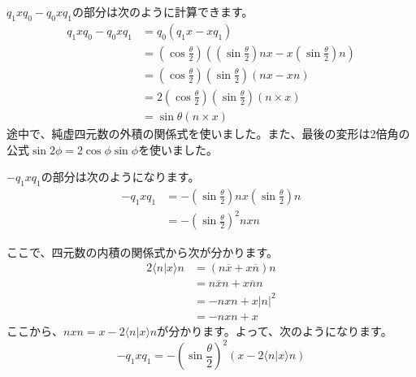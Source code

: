 \documentclass{jlreq}
\numberwithin{equation}{section}
\begin{document}
$q_1xq_0-q_0xq_1$の部分は次のように計算できます。
\begin{align}
    q_1xq_0-q_0xq_1 & =q_0(q_1x-xq_1)                                                                                                        \\
                    & =\left(\cos\frac{\theta}{2}\right)\left(\left(\sin\frac{\theta}{2}\right)nx-x\left(\sin\frac{\theta}{2}\right)n\right) \\
                    & =\left(\cos\frac{\theta}{2}\right)\left(\sin\frac{\theta}{2}\right)(nx-xn)                                             \\
                    & =2\left(\cos\frac{\theta}{2}\right)\left(\sin\frac{\theta}{2}\right)(n\times x)                                        \\
                    & =\sin\theta(n\times x)
\end{align}
途中で、純虚四元数の外積の関係式を使いました。また、最後の変形は2倍角の公式$\sin 2\phi=2\cos\phi\sin\phi$を使いました。

$-q_1xq_1$の部分は次のようになります。
\begin{align}
    -q_1xq_1 & =-\left(\sin\frac{\theta}{2}\right)nx\left(\sin\frac{\theta}{2}\right)n \\
             & =-\left(\sin\frac{\theta}{2}\right)^2nxn
\end{align}

ここで、四元数の内積の関係式から次が分かります。
\begin{align}
    2\langle n|x\rangle n & = (n\overline{x}+x\overline{n})n \\
                          & =n\overline{x}n+x\overline{n}n   \\
                          & =-nxn+x|n|^2                     \\
                          & =-nxn+x
\end{align}
ここから、$nxn=x-2\langle n|x\rangle n$が分かります。よって、次のようになります。
\begin{equation}
    -q_1xq_1=-\left(\sin\frac{\theta}{2}\right)^2(x-2\langle n|x\rangle n)
\end{equation}
\end{document}
